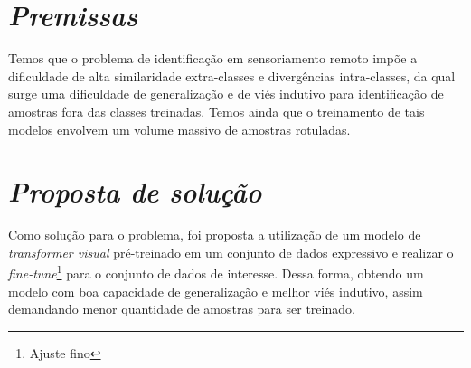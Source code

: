 



\section{\textit{Premissas}}\label{sec:Cap3_Premissas}

Temos que o problema de identificação em sensoriamento remoto impõe a dificuldade de alta similaridade extra-classes e divergências intra-classes, da qual surge uma dificuldade de generalização e de viés indutivo para identificação de amostras fora das classes treinadas. Temos ainda que o treinamento de tais modelos envolvem um volume massivo de amostras rotuladas. 



\section{\textit{Proposta de solução}}\label{sec:Cap3_Proposta}

Como solução para o problema, foi proposta a utilização de um modelo de \textit{transformer visual}  pré-treinado em um conjunto de dados expressivo e realizar o \textit{fine-tune}\footnote{Ajuste fino} para o conjunto de dados de interesse. Dessa forma, obtendo um modelo com boa capacidade de generalização e melhor viés indutivo, assim demandando menor quantidade de amostras para ser treinado.

